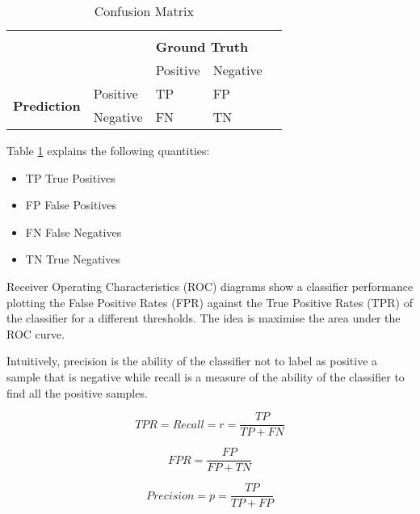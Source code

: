 \begin{table}[]
	\centering
	\begin{tabular}{lllll}
		                                     &          &                                           &          & \\
		\multirow{2}{*}{}                    &          & \multicolumn{2}{l}{\textbf{Ground Truth}} &            \\
		                                     &          & Positive                                  & Negative & \\
		\multirow{2}{*}{\textbf{Prediction}} & Positive & TP                                        & FP       & \\
		                                     & Negative & FN                                        & TN       &
	\end{tabular}
	\caption{Confusion Matrix}
	\label{table:confusion_matrix}
\end{table}

Table \ref{table:confusion_matrix} explains the following quantities:

\begin{itemize}
	\item TP True Positives
	\item FP False Positives
	\item FN False Negatives
	\item TN True Negatives
\end{itemize}

Receiver Operating Characteristics (ROC) diagrams show a classifier performance plotting the False Positive Rates (FPR) against the True Positive Rates (TPR) of the classifier for a different thresholds. The idea is maximise the area under the ROC curve.

Intuitively, precision is the ability of the classifier not to label as positive a sample that is negative while recall is a measure of the ability of the classifier to find all the positive samples. \cite{scikit-learn}


\begin{equation}
	TPR = Recall = r = \frac{TP}{TP+FN}
\end{equation}

\begin{equation}
	FPR = \frac{FP}{FP+TN}
\end{equation}

\begin{equation}
	Precision = p = \frac{TP}{TP+FP}
\end{equation}

